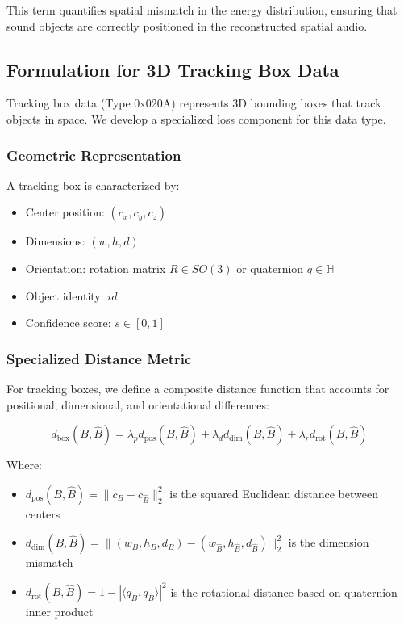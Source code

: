 This term quantifies spatial mismatch in the energy distribution, ensuring that sound objects are correctly positioned in the reconstructed spatial audio.

\subsection{Formulation for 3D Tracking Box Data}

Tracking box data (Type 0x020A) represents 3D bounding boxes that track objects in space. We develop a specialized loss component for this data type.

\subsubsection{Geometric Representation}

A tracking box is characterized by:
\begin{itemize}
\item Center position: $(c_x, c_y, c_z)$
\item Dimensions: $(w, h, d)$
\item Orientation: rotation matrix $R \in SO(3)$ or quaternion $q \in \mathbb{H}$
\item Object identity: $id$
\item Confidence score: $s \in [0,1]$
\end{itemize}

\subsubsection{Specialized Distance Metric}

For tracking boxes, we define a composite distance function that accounts for positional, dimensional, and orientational differences:

\begin{equation}
d_{\text{box}}(B, \hat{B}) = \lambda_p d_{\text{pos}}(B, \hat{B}) + \lambda_d d_{\text{dim}}(B, \hat{B}) + \lambda_r d_{\text{rot}}(B, \hat{B})
\end{equation}

Where:
\begin{itemize}
\item $d_{\text{pos}}(B, \hat{B}) = \|c_B - c_{\hat{B}}\|_2^2$ is the squared Euclidean distance between centers
\item $d_{\text{dim}}(B, \hat{B}) = \|(w_B, h_B, d_B) - (w_{\hat{B}}, h_{\hat{B}}, d_{\hat{B}})\|_2^2$ is the dimension mismatch
\item $d_{\text{rot}}(B, \hat{B}) = 1 - |\langle q_B, q_{\hat{B}} \rangle|^2$ is the rotational distance based on quaternion inner product
\end{itemize}

